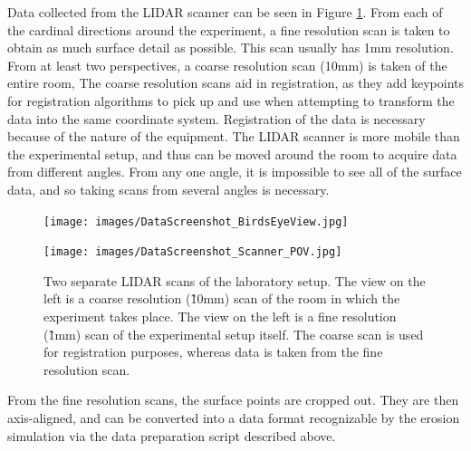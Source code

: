 Data collected from the LIDAR scanner can be seen in Figure \ref{figure:LIDARResults}. From each of the cardinal directions around the experiment, a fine resolution scan is taken to obtain as much surface detail as possible. This scan usually has 1mm resolution. From at least two perspectives, a coarse resolution scan (10mm) is taken of the entire room, The coarse resolution scans aid in registration, as they add keypoints for registration algorithms to pick up and use when attempting to transform the data into the same coordinate system. Registration of the data is necessary because of the nature of the equipment. The LIDAR scanner is more mobile than the experimental setup, and thus can be moved around the room to acquire data from different angles. From any one angle, it is impossible to see all of the surface data, and so taking scans from several angles is necessary.

\begin{figure}[t]
\centering
\begin{minipage}{0.45\linewidth}
\begin{center}
\texttt{[image: images/DataScreenshot\_BirdsEyeView.jpg]}
\end{center}
\end{minipage}
\begin{minipage}{0.45\linewidth}
\begin{center}
\texttt{[image: images/DataScreenshot\_Scanner\_POV.jpg]}
\end{center}
\end{minipage}
\caption[Data from the laboratory experiments, scanned with a LIDAR scanner]
{\label{figure:LIDARResults} Two separate LIDAR scans of the laboratory setup. The view on the left is a coarse resolution (\~10mm) scan of the room in which the experiment takes place. The view on the left is a fine resolution (\~1mm) scan of the experimental setup itself. The coarse scan is used for registration purposes, whereas data is taken from the fine resolution  scan.}
\end{figure}

From the fine resolution scans, the surface points are cropped out. They are then axis-aligned, and can be converted into a data format recognizable by the erosion simulation via the data preparation script described above.






